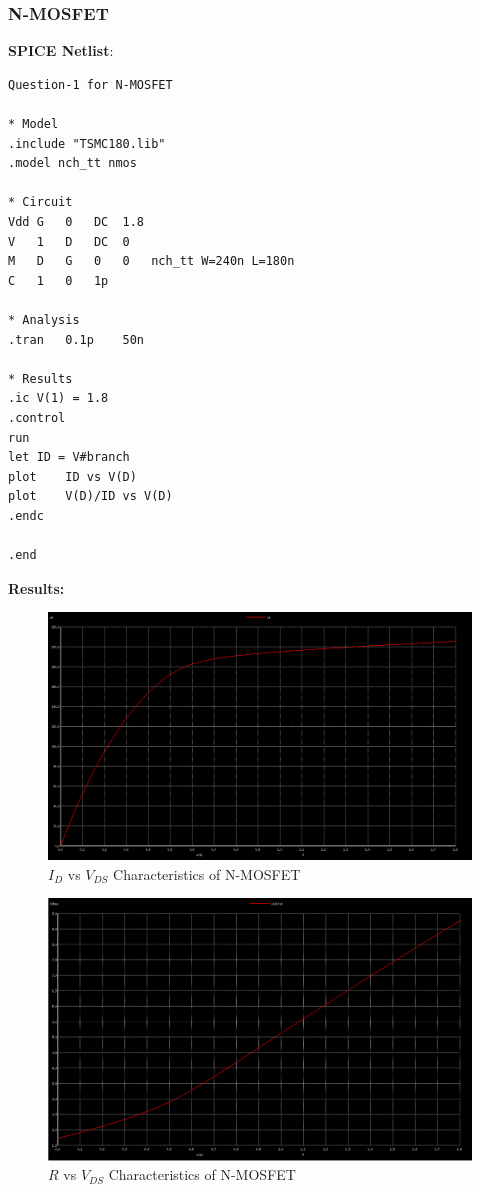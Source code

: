 \documentclass{article}
\begin{document}
\subsubsection{N-MOSFET}
\textbf{SPICE Netlist}:
\begin{lstlisting}
Question-1 for N-MOSFET

* Model
.include "TSMC180.lib"
.model nch_tt nmos

* Circuit
Vdd	G	0	DC	1.8	
V	1	D	DC	0
M	D	G	0	0	nch_tt W=240n L=180n
C	1	0	1p

* Analysis
.tran	0.1p	50n

* Results
.ic	V(1) = 1.8
.control
run
let ID = V#branch
plot	ID vs V(D)
plot	V(D)/ID vs V(D)
.endc

.end
\end{lstlisting}
\pagebreak
\textbf{Results:}
\begin{figure}[!ht]
    \centering
    \includegraphics[scale=0.23]{Images/1nmosa.png}
    \caption{$I_D$ vs $V_{DS}$ Characteristics of N-MOSFET}
\end{figure}
\begin{figure}[!ht]
    \centering
    \includegraphics[scale=0.24]{Images/1nmosb.png}
    \caption{$R$ vs $V_{DS}$ Characteristics of N-MOSFET}
\end{figure}
\end{document}

